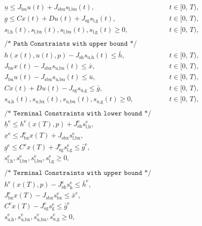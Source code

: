 \documentclass{article}
\newcommand{\ind}[1]{_{\textrm{#1}}}
\newcommand{\terminal}{^{\textrm{e}}}
\newcommand{\lowerh}{\ind{l,h}}
\newcommand{\lowerbx}{\ind{l,bx}}
\newcommand{\lowerbu}{\ind{l,bu}}
\newcommand{\lowerg}{\ind{l,g}}
\newcommand{\upperh}{\ind{u,h}}
\newcommand{\upperbx}{\ind{u,bx}}
\newcommand{\upperbu}{\ind{u,bu}}
\newcommand{\upperg}{\ind{u,g}}
\newcommand{\mathComment}[1]{\texttt{/* #1 */}}
\begin{document}
\begin{align*}
	&&&\underline{u} \leq J_{\textrm{bu}} u(t) + J_{\textrm{sbu}} s\lowerbu(t), &&\quad t \in [0,\,T),\\
	&&&\underline{g} \leq Cx(t) + Du(t) + J_{\textrm{sg}} s\lowerg(t), &&\quad t \in [0,\,T), \\
	&&& s\lowerh (t), s\lowerbx(t), s\lowerbu(t), s\lowerg(t) \geq 0, &&\quad t \in [0,\,T), \\
	&&& && \\[-1em]
	&&&\mathComment{Path Constraints with upper bound}\\
	&&& h(x(t), u(t), p) - J_{\textrm{sh}} s\upperh(t) \leq \bar{h}, &&\quad t \in [0,\,T),\\
	&&& J_{\textrm{bx}} x(t) - J_{\textrm{sbx}} s\upperbx(t) \leq \bar{x}, &&\quad t \in [0,\,T),\\
	&&& J_{\textrm{bu}} u(t) - J_{\textrm{sbu}} s\upperbu(t)\leq \bar{u}, &&\quad t \in [0,\,T),\\
	&&&Cx(t) + Du(t) - J_{\textrm{sg}} s\upperg \leq \bar{g}, &&\quad t \in [0,\,T), \\
	&&& s\upperh(t), s\upperbx(t), s\upperbu(t), s\upperg(t) \geq 0, &&\quad t \in [0,\,T), \\
	&&& && \\[-1em]
	&&&\mathComment{Terminal Constraints with lower bound}\\
	&&&\underline{h}\terminal \leq h\terminal(x(T), p) + J\ind{sh}\terminal s\lowerh\terminal, &&\\
	&&&\underline{x}\terminal \leq J_{\textrm{bx}}\terminal x(T) + J\ind{sbx} s\lowerbx\terminal, &&\\ %
	&&&\underline{g}\terminal \leq C\terminal x(T) + J\ind{sg}\terminal s\lowerg\terminal \leq \bar{g}\terminal, && \\
	&&& s\lowerh\terminal, s\lowerbx\terminal, s\lowerbu\terminal, s\lowerg\terminal \geq 0, \\
	&&& && \\[-1em]
	&&&\mathComment{Terminal Constraints with upper bound}\\
	&&& h\terminal(x(T), p) - J\ind{sh}\terminal s\ind{h}\terminal \leq \bar{h}\terminal, &&\\
	&&& J_{\textrm{bx}}\terminal x(T) - J\ind{sbx} s\ind{bx}\terminal \leq \bar{x}^{e}, &&\\ %
	&&& C\terminal x(T) - J\ind{sg}\terminal s\ind{g}\terminal \leq \bar{g}\terminal \\
	&&& s\upperh\terminal, s\upperbx\terminal, s\upperbu\terminal, s\upperg\terminal \geq 0,
\end{align*}
\end{document}
